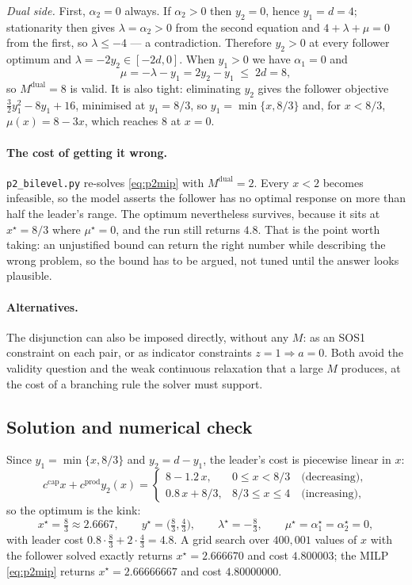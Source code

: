 \documentclass[11pt]{article}
\theoremstyle{definition}
\begin{document}
\emph{Dual side.} First, $\alpha_2 = 0$ always. If $\alpha_2 > 0$ then
$y_2 = 0$, hence $y_1 = d = 4$; stationarity then gives
$\lambda = \alpha_2 > 0$ from the second equation and
$4 + \lambda + \mu = 0$ from the first, so $\lambda \le -4$ --- a
contradiction. Therefore $y_2 > 0$ at every follower optimum and
$\lambda = -2y_2 \in [-2d, 0]$. When $y_1 > 0$ we have $\alpha_1 = 0$
and
\[
  \mu = -\lambda - y_1 = 2y_2 - y_1 \;\le\; 2d = 8 ,
\]
so $M^{\mathrm{dual}} = 8$ is valid. It is also tight: eliminating
$y_2$ gives the follower objective
$\tfrac32 y_1^2 - 8y_1 + 16$, minimised at $y_1 = 8/3$, so
$y_1 = \min\{x, 8/3\}$ and, for $x < 8/3$,
$\mu(x) = 8 - 3x$, which reaches $8$ at $x = 0$.

\paragraph{The cost of getting it wrong.} \texttt{p2\_bilevel.py}
re-solves \eqref{eq:p2mip} with $M^{\mathrm{dual}} = 2$. Every
$x < 2$ becomes infeasible, so the model asserts the follower has no
optimal response on more than half the leader's range. The optimum
nevertheless survives, because it sits at $x^\star = 8/3$ where
$\mu^\star = 0$, and the run still returns $4.8$. That is the point
worth taking: an unjustified bound can return the right number while
describing the wrong problem, so the bound has to be argued, not tuned
until the answer looks plausible.

\paragraph{Alternatives.} The disjunction can also be imposed directly,
without any $M$: as an SOS1 constraint on each pair, or as indicator
constraints $z = 1 \Rightarrow a = 0$. Both avoid the validity question
and the weak continuous relaxation that a large $M$ produces, at the
cost of a branching rule the solver must support.

\subsection*{Solution and numerical check}

Since $y_1 = \min\{x, 8/3\}$ and $y_2 = d - y_1$, the leader's cost is
piecewise linear in $x$:
\[
  c^{\mathrm{cap}} x + c^{\mathrm{prod}} y_2(x) =
  \begin{cases}
    8 - 1.2\,x, & 0 \le x < 8/3 \quad \text{(decreasing)},\\[2pt]
    0.8\,x + 8/3, & 8/3 \le x \le 4 \quad \text{(increasing)},
  \end{cases}
\]
so the optimum is the kink:
\[
  x^\star = \tfrac83 \approx 2.6667, \qquad
  y^\star = \bigl(\tfrac83, \tfrac43\bigr), \qquad
  \lambda^\star = -\tfrac83, \qquad
  \mu^\star = \alpha_1^\star = \alpha_2^\star = 0,
\]
with leader cost $0.8 \cdot \tfrac83 + 2 \cdot \tfrac43 = 4.8$. A grid
search over $400{,}001$ values of $x$ with the follower solved exactly
returns $x^\star = 2.666670$ and cost $4.800003$; the MILP
\eqref{eq:p2mip} returns $x^\star = 2.66666667$ and cost
$4.80000000$.
\end{document}
